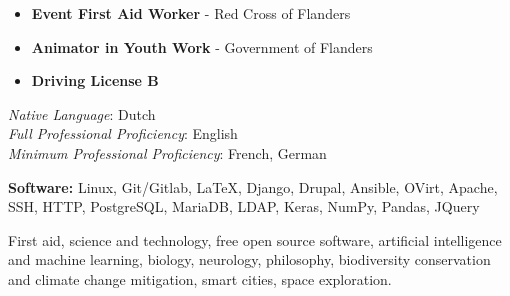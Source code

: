 
\begin{itemize}
    \item \textbf{Event First Aid Worker} - Red Cross of Flanders
    \item \textbf{Animator in Youth Work} - Government of Flanders
    \item \textbf{Driving License B}
\end{itemize}








\textit{Native Language}: Dutch \\
\textit{Full Professional Proficiency}: English \\
\textit{Minimum Professional Proficiency}: French, German \\





\smallskip

\textbf{Software:} Linux, Git/Gitlab, \LaTeX, Django, Drupal, Ansible, OVirt, Apache, SSH, HTTP, PostgreSQL, MariaDB, LDAP, Keras, NumPy, Pandas, JQuery

First aid, science and technology, free open source software, artificial intelligence and machine learning, biology, neurology, philosophy, biodiversity conservation and climate change mitigation, smart cities, space exploration.

